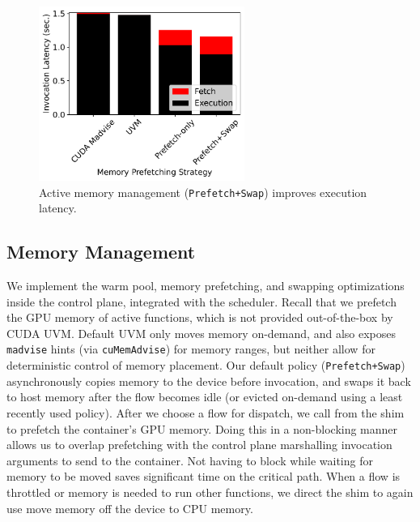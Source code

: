 \begin{figure}
  \centering
  \includegraphics[width=0.6\textwidth]{./mqfq-final/graphs/mem-move/f16-i20-driver-mps-move.pdf}
  \caption{Active memory management (\texttt{Prefetch+Swap}) improves execution latency.}
  \label{fig:mem-prefetch}
\end{figure}

\subsection{Memory Management}

We implement the warm pool, memory prefetching, and swapping optimizations inside the control plane, integrated with the scheduler. 
Recall that we prefetch the GPU memory of active functions, which is not provided out-of-the-box by CUDA UVM. 
Default UVM only moves memory on-demand, and also exposes \texttt{madvise} hints (via \texttt{cuMemAdvise}) for memory ranges, but neither allow for deterministic control of memory placement.
Our default policy (\texttt{Prefetch+Swap}) asynchronously copies memory to the device before invocation, and swaps it back to host memory after the flow becomes idle (or evicted on-demand using a least recently used policy). 
After we choose a flow for dispatch, we call  from the shim to prefetch the container's GPU memory.
Doing this in a non-blocking manner allows us to overlap prefetching with the control plane marshalling invocation arguments to send to the container. 
Not having to block while waiting for memory to be moved saves significant time on the critical path.
When a flow is throttled or memory is needed to run other functions, we direct the shim to again use  move memory off the device to CPU memory. 


